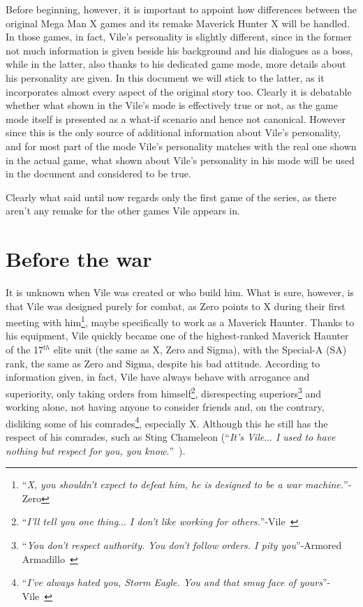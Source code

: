 Before beginning, however, it is important to appoint how differences between the original Mega Man X games and its remake Maverick Hunter X will be handled. In those games, in fact, Vile's personality is slightly different, since in the former not much information is given beside his background and his dialogues as a boss, while in the latter, also thanks to his dedicated game mode, more details about his personality are given. In this document we will stick to the latter, as it incorporates almost every aspect of the original story too. Clearly it is debatable whether what shown in the Vile's mode is effectively true or not, as the game mode itself is presented as a what-if scenario and hence not canonical. However since this is the only source of additional information about Vile's personality, and for most part of the mode Vile's personality matches with the real one shown in the actual game, what shown about Vile's personality in his mode will be used in the document and considered to be true.

Clearly what said until now regards only the first game of the series, as there aren't any remake for the other games Vile appears in.

\section{Before the war}
It is unknown when Vile was created or who build him. What is sure, however, is that Vile was designed purely for combat, as Zero points to X during their first meeting with him\footnote{``\textit{X, you shouldn't expect to defeat him, he is designed to be a war machine.}''- Zero}, maybe specifically to work as a Maverick Haunter. Thanks to his equipment, Vile quickly became one of the highest-ranked Maverick Haunter of the 17$^{th}$ elite unit (the same as X, Zero and Sigma), with the Special-A (SA) rank, the same as Zero and Sigma, despite his bad attitude. According to information given, in fact, Vile have always behave with arrogance and superiority, only taking orders from himself\footnote{``\textit{I'll tell you one thing$\dots$ I don't like working for others.}''-Vile~\cite{MHX:Vile_script}}, disrespecting superiors\footnote{``\textit{You don't respect authority. You don't follow orders. I pity you}''-Armored Armadillo~\cite{MHX:Vile_script}} and working alone, not having anyone to consider friends and, on the contrary, disliking some of his comrades\footnote{``\textit{I've always hated you, Storm Eagle. You and that smug face of yours}''-Vile~\cite{MHX:Vile_script}}, especially X. Although this he still has the respect of his comrades, such as Sting Chameleon (``\textit{It's Vile$\dots$ I used to have nothing but respect for you, you know.}''~\cite{MHX:Vile_script}).

